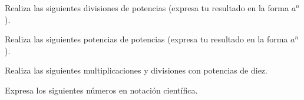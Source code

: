 \documentclass[11pt,addpoints]{exam}
\begin{document}
\begin{questions}
    \question[10] Realiza las siguientes divisiones de potencias (expresa tu resultado en la forma $a^n$).
    \begin{multicols}{2}
        \begin{parts}
            
            
        \end{parts}
    \end{multicols}
\newpage
    \question[10] Realiza las siguientes potencias de potencias (expresa tu resultado en la forma $a^n$).
    \begin{multicols}{2}
        \begin{parts}
            
            
        \end{parts}
    \end{multicols}

    \question[10] Realiza las siguientes multiplicaciones y divisiones con potencias de diez.
    \begin{parts}
        
        
    \end{parts}
    \question[10] Expresa los siguientes n\'umeros en notaci\'on cient\'ifica.
    \begin{multicols}{2}
        \begin{parts}
            
            
        \end{parts}
    \end{multicols}
\end{questions}
\end{document}
